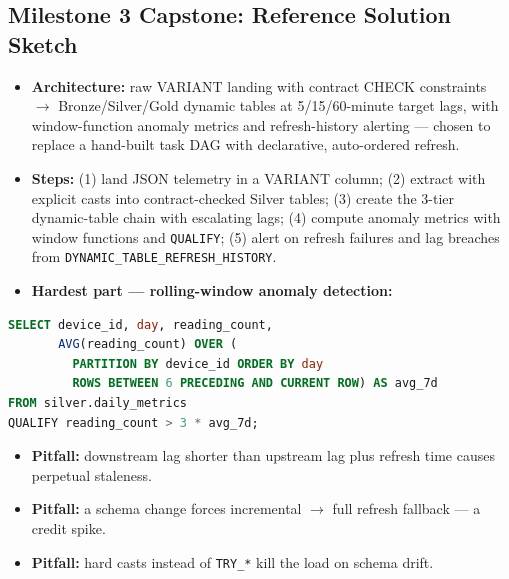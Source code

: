 \documentclass[11pt, a4paper]{article}
\begin{document}
\subsection*{Milestone 3 Capstone: Reference Solution Sketch}
\begin{itemize}[label=-, nosep]
    \item \textbf{Architecture:} raw VARIANT landing with contract CHECK constraints $\rightarrow$ Bronze/Silver/Gold dynamic tables at 5/15/60-minute target lags, with window-function anomaly metrics and refresh-history alerting --- chosen to replace a hand-built task DAG with declarative, auto-ordered refresh.
    \item \textbf{Steps:} (1) land JSON telemetry in a VARIANT column; (2) extract with explicit casts into contract-checked Silver tables; (3) create the 3-tier dynamic-table chain with escalating lags; (4) compute anomaly metrics with window functions and \texttt{QUALIFY}; (5) alert on refresh failures and lag breaches from \texttt{DYNAMIC\_TABLE\_REFRESH\_HISTORY}.
    \item \textbf{Hardest part --- rolling-window anomaly detection:}
\end{itemize}
\begin{lstlisting}[language=SQL, caption={Anomaly flag via 7-day rolling average}]
SELECT device_id, day, reading_count,
       AVG(reading_count) OVER (
         PARTITION BY device_id ORDER BY day
         ROWS BETWEEN 6 PRECEDING AND CURRENT ROW) AS avg_7d
FROM silver.daily_metrics
QUALIFY reading_count > 3 * avg_7d;
\end{lstlisting}
\begin{itemize}[label=-, nosep]
    \item \textbf{Pitfall:} downstream lag shorter than upstream lag plus refresh time causes perpetual staleness.
    \item \textbf{Pitfall:} a schema change forces incremental $\rightarrow$ full refresh fallback --- a credit spike.
    \item \textbf{Pitfall:} hard casts instead of \texttt{TRY\_*} kill the load on schema drift.
\end{itemize}
\end{document}
